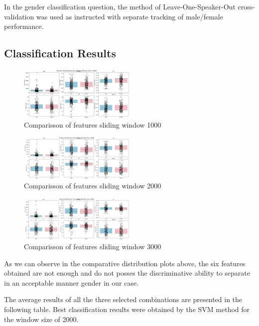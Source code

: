 \documentclass[12pt]{ieeetj}
\begin{document}
In the gender classification question, the method of 
Leave-One-Speaker-Out cross-validation was used as instructed
with separate tracking of male/female performance.

\subsection{Classification Results}
		\begin{figure}[H]
			\centering
			\includegraphics[width=0.5\textwidth]{g1000.png}
			\caption{Comparisson of features sliding window 1000}
			\label{fig4:}
		\end{figure}		

		\begin{figure}[H]
			\centering
			\includegraphics[width=0.5\textwidth]{g2000.png}
			\caption{Comparisson of features sliding window 2000}
			\label{fig4:}
		\end{figure}		

		\begin{figure}[H]
			\centering
			\includegraphics[width=0.5\textwidth]{g3000.png}
			\caption{Comparisson of features sliding window 3000}
			\label{fig4:}
		\end{figure}		

As we can observe in the comparative distribution plots above, the six features obtained
are not enough and do not posses the discriminative ability to separate in an acceptable manner
gender in our case. 


The average results of all the three selected combinations are presented in the following table.
Best classification results were obtained by the SVM method for the window size of 2000.
\end{document}
